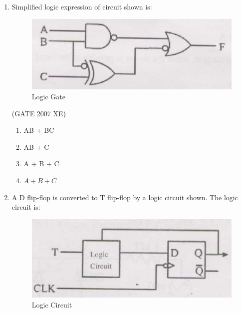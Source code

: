 \documentclass[journal,cmex10]{IEEEtran}
\theoremstyle{remark}
\numberwithin{equation}{enumi}
\numberwithin{figure}{enumi}
\begin{document}
\begin{enumerate}
    \item Simplified logic expression of circuit shown is:
    \begin{figure}[htbp]
  \centering
  \includegraphics[width=0.6\columnwidth]{figs/C/fig11.png}
  \caption{Logic Gate}
  \label{fig:C/fig11.png}
\end{figure}

    \hfill{(GATE 2007 XE)}
    \begin{multicols}{4}
    \begin{enumerate}
        \item AB + BC
        \item AB + C
        \item A + B + C
        \item $\overline{A + B + C}$
    \end{enumerate}
    \end{multicols}

\newpage

    \item A D flip-flop is converted to T flip-flop by a logic circuit shown. The logic circuit is:
    \begin{figure}[htbp]
  \centering
  \includegraphics[width=0.6\columnwidth]{figs/C/fig12.png}
  \caption{Logic Circuit}
  \label{fig:C/fig12.png}
\end{figure}
    

\end{enumerate}
\end{document}
